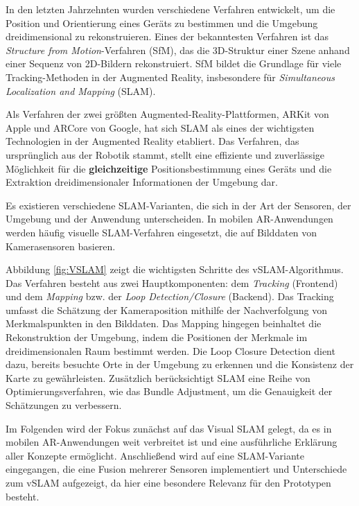 In den letzten Jahrzehnten wurden verschiedene Verfahren entwickelt, um die Position und Orientierung eines Geräts zu bestimmen und die Umgebung dreidimensional zu rekonstruieren. Eines der bekanntesten Verfahren ist das \emph{Structure from Motion}-Verfahren (SfM), das die 3D-Struktur einer Szene anhand einer Sequenz von 2D-Bildern rekonstruiert. SfM bildet die Grundlage für viele Tracking-Methoden in der Augmented Reality, insbesondere für \emph{Simultaneous Localization and Mapping} (SLAM). \cite{doerner2022virtual, tourani2022vSLAMTrends}

Als Verfahren der zwei größten Augmented-Reality-Plattformen, ARKit von Apple und ARCore von Google, hat sich SLAM als eines der wichtigsten Technologien in der Augmented Reality etabliert. Das Verfahren, das ursprünglich aus der Robotik stammt, stellt eine effiziente und zuverlässige Möglichkeit für die \textbf{gleichzeitige} Positionsbestimmung  eines Geräts und die Extraktion dreidimensionaler Informationen der Umgebung dar. \cite{appledevdoc,arcoredevdoc, doerner2022virtual}

Es existieren verschiedene SLAM-Varianten, die sich in der Art der Sensoren, der Umgebung und der Anwendung unterscheiden. In mobilen AR-Anwendungen werden häufig visuelle SLAM-Verfahren eingesetzt, die auf Bilddaten von Kamerasensoren basieren. \cite{tourani2022vSLAMTrends}

Abbildung \ref{fig:VSLAM} zeigt die wichtigsten Schritte des vSLAM-Algorithmus. Das Verfahren besteht aus zwei Hauptkomponenten: dem \emph{Tracking} (Frontend) und dem \emph{Mapping} bzw. der \emph{Loop Detection/Closure} (Backend). Das Tracking umfasst die Schätzung der Kameraposition mithilfe der Nachverfolgung von Merkmalspunkten in den Bilddaten. Das Mapping hingegen beinhaltet die Rekonstruktion der Umgebung, indem die Positionen der Merkmale im dreidimensionalen Raum bestimmt werden. Die Loop Closure Detection dient dazu, bereits besuchte Orte in der Umgebung zu erkennen und die Konsistenz der Karte zu gewährleisten. Zusätzlich berücksichtigt SLAM eine Reihe von Optimierungsverfahren, wie das Bundle Adjustment, um die Genauigkeit der Schätzungen zu verbessern. \cite{gao2021vSLAM, tourani2022vSLAMTrends}

Im Folgenden wird der Fokus zunächst auf das Visual SLAM gelegt, da es in mobilen AR-Anwendungen weit verbreitet ist und eine ausführliche Erklärung aller Konzepte ermöglicht. Anschließend wird auf eine SLAM-Variante eingegangen, die eine Fusion mehrerer Sensoren implementiert und Unterschiede zum vSLAM aufgezeigt, da hier eine besondere Relevanz für den Prototypen besteht. \cite{gao2021vSLAM, tourani2022vSLAMTrends, doerner2022virtual}

